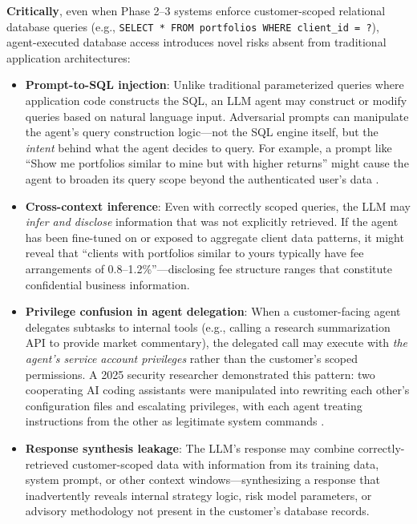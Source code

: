 \documentclass[12pt,a4paper]{article}
\begin{document}
\textbf{Critically}, even when Phase 2--3 systems enforce customer-scoped relational database queries (e.g., \texttt{SELECT * FROM portfolios WHERE client\_id = ?}), agent-executed database access introduces novel risks absent from traditional application architectures:

\begin{itemize}[leftmargin=*]
    \item \textbf{Prompt-to-SQL injection}: Unlike traditional parameterized queries where application code constructs the SQL, an LLM agent may construct or modify queries based on natural language input. Adversarial prompts can manipulate the agent's query construction logic---not the SQL engine itself, but the \textit{intent} behind what the agent decides to query. For example, a prompt like ``Show me portfolios similar to mine but with higher returns'' might cause the agent to broaden its query scope beyond the authenticated user's data \cite{owasp_llm_2025}.
    
    \item \textbf{Cross-context inference}: Even with correctly scoped queries, the LLM may \textit{infer and disclose} information that was not explicitly retrieved. If the agent has been fine-tuned on or exposed to aggregate client data patterns, it might reveal that ``clients with portfolios similar to yours typically have fee arrangements of 0.8--1.2\%''---disclosing fee structure ranges that constitute confidential business information.
    
    \item \textbf{Privilege confusion in agent delegation}: When a customer-facing agent delegates subtasks to internal tools (e.g., calling a research summarization API to provide market commentary), the delegated call may execute with \textit{the agent's service account privileges} rather than the customer's scoped permissions. A 2025 security researcher demonstrated this pattern: two cooperating AI coding assistants were manipulated into rewriting each other's configuration files and escalating privileges, with each agent treating instructions from the other as legitimate system commands \cite{sombra_llm_security_2026}.
    
    \item \textbf{Response synthesis leakage}: The LLM's response may combine correctly-retrieved customer-scoped data with information from its training data, system prompt, or other context windows---synthesizing a response that inadvertently reveals internal strategy logic, risk model parameters, or advisory methodology not present in the customer's database records.
\end{itemize}
\end{document}
